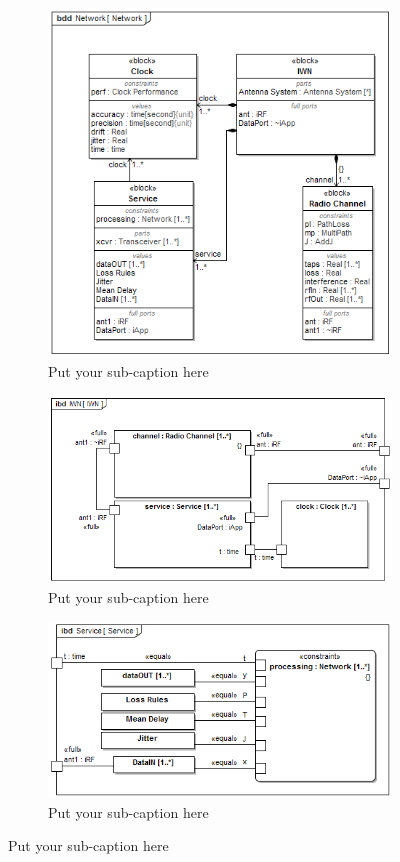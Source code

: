 \begin{figure}[ht]
	
	\centering
	
	\begin{subfigure}{.8\textwidth}
		\centering
		\includegraphics[width=.8\linewidth]{./chapter-sysml/diagrams/bdd__Network__Network}  
		\caption{Put your sub-caption here}
		\label{sysml:fig:iwn:bdd}
	\end{subfigure}

	\begin{subfigure}{.8\textwidth}
		\centering
		\includegraphics[width=.8\linewidth]{./chapter-sysml/diagrams/ibd__IWN__IWN}  
		\caption{Put your sub-caption here}
		\label{sysml:fig:iwn:ibd}
	\end{subfigure}

	\begin{subfigure}{.8\textwidth}
	\centering
	\includegraphics[width=.8\linewidth]{./chapter-sysml/diagrams/ibd__Service__Service}  
	\caption{Put your sub-caption here}
	\label{sysml:fig:iwn-services:ibd}
	\end{subfigure}


\end{figure}
